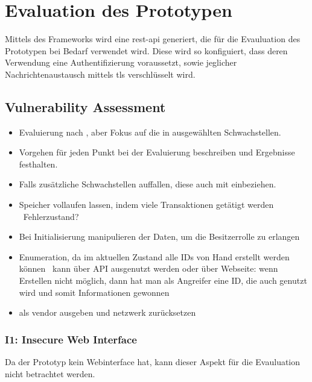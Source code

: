 \section{Evaluation des Prototypen}
\label{sec:evaluation}
    Mittels des Frameworks wird eine \gls{rest}-\gls{api} generiert, die für die Evauluation des Prototypen bei Bedarf verwendet wird. 
    Diese wird so konfiguiert, dass deren Verwendung eine Authentifizierung voraussetzt, sowie jeglicher Nachrichtenaustausch mittels \gls{tls} verschlüsselt wird.

    \subsection{Vulnerability Assessment}
        \begin{itemize}[noitemsep]
            \item Evaluierung nach \cite{Miessler}, aber Fokus auf die in  ausgewählten Schwachstellen. 
            \item Vorgehen für jeden Punkt bei der Evaluierung beschreiben und Ergebnisse festhalten. 
            \item Falls zusätzliche Schwachstellen auffallen, diese auch mit einbeziehen.
        \end{itemize}
        
        \begin{itemize}[noitemsep]
            \item Speicher vollaufen lassen, indem viele Transaktionen getätigt werden \textrightarrow\ Fehlerzustand?
            \item Bei Initialisierung manipulieren der Daten, um die Besitzerrolle zu erlangen
            \item Enumeration, da im aktuellen Zustand alle IDs von Hand erstellt werden können \textrightarrow\ kann über API ausgenutzt werden oder über Webseite: wenn Erstellen nicht möglich, dann hat man als Angreifer eine ID, die auch genutzt wird und somit Informationen gewonnen
            \item als vendor ausgeben und netzwerk zurücksetzen
        \end{itemize}
    
        \subsubsection*{I1: Insecure Web Interface}
            Da der Prototyp kein Webinterface hat, kann dieser Aspekt für die Evauluation nicht betrachtet werden.
           
